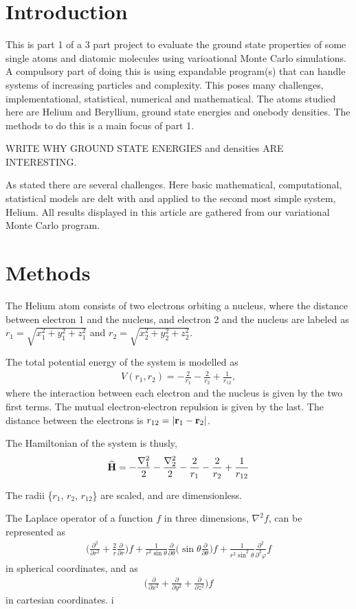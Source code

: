 \documentclass[twocolumn]{article}[12pt]
\newcommand{\eq}[1]{\begin{align*}#1\end{align*}}
\renewcommand\vec[1]{{\bf #1}}
\newcommand{\OP}[1]{{\bf\widehat{#1}}}
\begin{document}
\section{Introduction}
This is part 1 of a 3 part project to evaluate the ground state properties of some 
single atoms and diatomic molecules using varioational Monte Carlo simulations.  A 
compulsory part of doing this is using expandable program(s) that can handle systems
of increasing particles and complexity. This poses many challenges, implementational, 
statistical, numerical and mathematical. The atoms studied here are Helium and Beryllium, 
ground state energies and onebody densities. The methods to do this is a main focus of part 1. 
 
WRITE WHY GROUND STATE ENERGIES and densities ARE INTERESTING. 

As stated there are several challenges. Here basic mathematical,
computational, statistical models are delt with and applied to the second most simple
system, Helium. All results displayed in this article are gathered from our variational Monte Carlo program. 

\section{Methods}
The Helium atom consists of two electrons orbiting a nucleus,
where the distance between electron 1 and the nucleus,
and electron 2 and the nucleus are labeled as
$r_1 = \sqrt{x_1^2 + y_1^2 + z_1^2}$ 
and $r_2 = \sqrt{x_2^2 + y_2^2 + z_2^2}$.

The total potential energy of the system is modelled as
{\small
\eq{
    V(r_1,r_2)=-\frac{2}{r_1}-\frac{2}{r_2}+\frac{1}{r_{12}},
}}%
where the interaction between each electron and the nucleus
is given by the two first terms. 
The mutual electron-electron repulsion is given by the last.
The distance between the electrons is $r_{12}=|\vec r_1-\vec r_2|$.

The Hamiltonian of the system is thusly, 
{\small
\eq{
    \OP H = -\frac{\nabla_1 ^2}{2} -\frac{\nabla_2 ^2}{2}
    -\frac{2}{r_1}-\frac{2}{r_2}+\frac{1}{r_{12}}
}}%

The radii \{$r_1$, $r_2$, $r_{12}$\} are scaled, and are dimensionless.

The Laplace operator of a function $f$ in three dimensions, $\nabla^2 f$,
can be represented as
{\small
\eq{
  \bigg( \frac{\partial^2}{\partial r^2} 
    + \frac{2}{r} \frac{\partial}{\partial r} \bigg) f
    +\frac{1}{r^2 \sin\theta}\frac{\partial}{\partial \theta}
    \bigg( \sin\theta \frac{\partial}{\partial \theta}  \bigg) f
    +\frac{1}{r^2 \sin^2\theta}\frac{\partial^2}{\partial^2 \varphi} f
}}%
in spherical coordinates, and as
{\small
\eq{
	\bigg( 
	\frac{\partial}{\partial x^2} +
	\frac{\partial}{\partial y^2} +
	\frac{\partial}{\partial z^2}
	\bigg) f
}}%
in cartesian coordinates.
i
\end{document}
